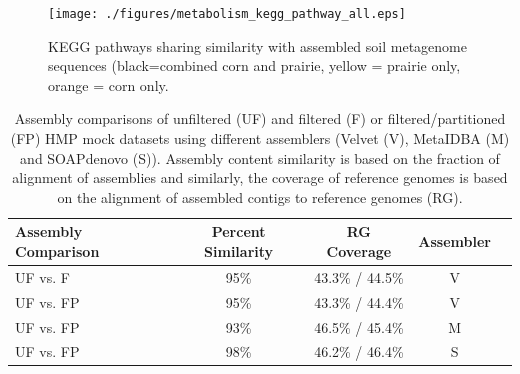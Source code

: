 \documentclass{pnastwo}
\begin{document}
\begin{figure}
\begin{center}
\centerline{\texttt{[image: ./figures/metabolism\_kegg\_pathway\_all.eps]}}
\caption{KEGG pathways sharing similarity with assembled soil metagenome sequences (black=combined corn and prairie, yellow = prairie only, orange = corn only.}
\label{kegg}
\end{center}
\end{figure}


\begin{table}
\caption{Assembly comparisons of unfiltered (UF) and filtered (F) or
  filtered/partitioned (FP) HMP mock datasets using different
  assemblers (Velvet (V), MetaIDBA (M) and SOAPdenovo (S)).  Assembly
  content similarity is based on the fraction of alignment of
  assemblies and similarly, the coverage of reference genomes is based
  on the alignment of assembled contigs to reference genomes (RG).}
\begin{tabular}{@{\extracolsep{\fill}}lcccc}
\hline
Assembly Comparison & Percent Similarity
 & RG Coverage & Assembler \\
\hline
UF vs. F & 95\% & 43.3\% / 44.5\% & V \\
UF vs. FP & 95\% & 43.3\% / 44.4\% & V\\
UF vs. FP & 93\% & 46.5\% / 45.4\% & M\\ 
UF vs. FP & 98\% &  46.2\% / 46.4\% & S\\
\hline
\end{tabular}
\label{assembly-compare}
\end{table}
\end{document}
